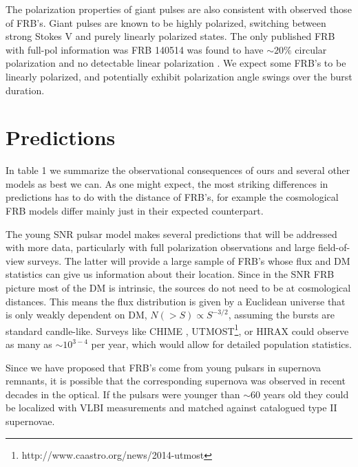 \documentclass[useAMS,usenatbib]{mn2e}
\begin{document}
The polarization properties of giant pulses are also consistent with
observed those of FRB's. Giant pulses are known to be highly polarized, 
switching between strong Stokes V and purely linearly polarized states. 
The only published FRB with full-pol information was FRB 140514 was 
found to have $\sim20\%$ circular polarization and no detectable 
linear polarization \citep{2014arXiv1412.0342P}.  We expect some FRB's
to be linearly polarized, and potentially exhibit polarization angle
swings over the burst duration.

\section{Predictions}
\label{sec-predictions}

In table 1 we summarize the observational consequences
of ours and several other models as best we can. As one might expect,
the most striking differences in predictions has to do with the distance of FRB's,
for example the cosmological FRB models differ mainly just in their expected 
counterpart. 

The young SNR pulsar model makes several predictions that will
be addressed with more data, particularly with full polarization 
observations and large field-of-view surveys. 
The latter will provide a large sample of FRB's whose flux and DM statistics
 can give us information about their location. Since in the SNR FRB picture
most of the DM is intrinsic, the sources do not need to be at cosmological 
distances. This means the flux distribution is given by a Euclidean universe
that is only weakly dependent on DM, $N(>S) \propto S^{-3/2}$, assuming
the bursts are standard candle-like.
Surveys
like CHIME \citep{2014SPIE.9145E..22B}, 
UTMOST\footnote{http://www.caastro.org/news/2014-utmost},
 or HIRAX could observe as many as $\sim10^{3-4}$
per year, which would allow for detailed population statistics.

Since we have proposed that FRB's come from young pulsars 
in supernova remnants, it is possible that the corresponding 
supernova was observed in recent decades in the optical. If the pulsars
were younger than $\sim$60 years old they could be localized with VLBI
measurements and matched against catalogued type II supernovae. 
\end{document}
